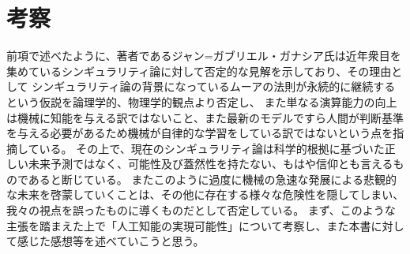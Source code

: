 \documentclass[uplatex]{jsarticle}
\begin{document}
\section{考察}
前項で述べたように、著者であるジャン=ガブリエル・ガナシア氏は近年衆目を集めているシンギュラリティ論に対して否定的な見解を示しており、その理由として
シンギュラリティ論の背景になっているムーアの法則が永続的に継続するという仮説を論理学的、物理学的観点より否定し、
また単なる演算能力の向上は機械に知能を与える訳ではないこと、また最新のモデルですら人間が判断基準を与える必要があるため機械が自律的な学習をしている訳ではないという点を指摘している。
その上で、現在のシンギュラリティ論は科学的根拠に基づいた正しい未来予測ではなく、可能性及び蓋然性を持たない、もはや信仰とも言えるものであると断じている。
またこのように過度に機械の急速な発展による悲観的な未来を啓蒙していくことは、その他に存在する様々な危険性を隠してしまい、我々の視点を誤ったものに導くものだとして否定している。
まず、このような主張を踏まえた上で「人工知能の実現可能性」について考察し、また本書に対して感じた感想等を述べていこうと思う。
\end{document}
